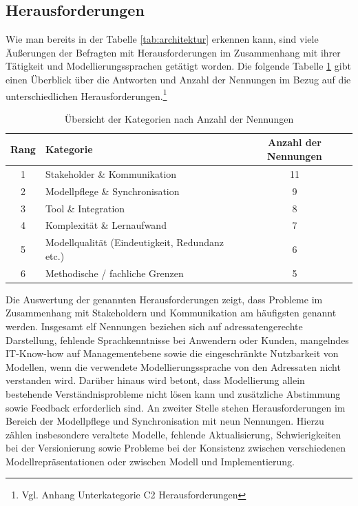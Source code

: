 \subsection{Herausforderungen}

Wie man bereits in der Tabelle \ref{tab:architektur} erkennen kann, sind viele Äußerungen der Befragten mit Herausforderungen im Zusammenhang mit ihrer Tätigkeit und Modellierungssprachen getätigt worden.
Die folgende Tabelle \ref{tab:C2kategorien} gibt einen Überblick über die Antworten und Anzahl der Nennungen im Bezug auf die unterschiedlichen Herausforderungen.\footnote{Vgl. Anhang Unterkategorie C2 Herausforderungen}

 \begin{table}[h!]
\centering
\caption{Übersicht der Kategorien nach Anzahl der Nennungen}
\begin{tabular}{c l c}
\toprule
\textbf{Rang} & \textbf{Kategorie} & \textbf{Anzahl der Nennungen} \\
\midrule
1 & Stakeholder \& Kommunikation & 11 \\
2 & Modellpflege \& Synchronisation & 9 \\
3 & Tool \& Integration & 8 \\
4 & Komplexität \& Lernaufwand & 7 \\
5 & Modellqualität (Eindeutigkeit, Redundanz etc.) & 6 \\
6 & Methodische / fachliche Grenzen & 5 \\
\bottomrule
\end{tabular}

\label{tab:C2kategorien}
\end{table}

Die Auswertung der genannten Herausforderungen zeigt, dass Probleme im Zusammenhang mit Stakeholdern und Kommunikation am häufigsten genannt werden. Insgesamt elf Nennungen beziehen sich auf adressatengerechte Darstellung, fehlende Sprachkenntnisse bei Anwendern oder Kunden, mangelndes IT-Know-how auf Managementebene sowie die eingeschränkte Nutzbarkeit von Modellen, wenn die verwendete Modellierungssprache von den Adressaten nicht verstanden wird. Darüber hinaus wird betont, dass Modellierung allein bestehende Verständnisprobleme nicht lösen kann und zusätzliche Abstimmung sowie Feedback erforderlich sind.
An zweiter Stelle stehen Herausforderungen im Bereich der Modellpflege und Synchronisation mit neun Nennungen. Hierzu zählen insbesondere veraltete Modelle, fehlende Aktualisierung, Schwierigkeiten bei der Versionierung sowie Probleme bei der Konsistenz zwischen verschiedenen Modellrepräsentationen oder zwischen Modell und Implementierung.

